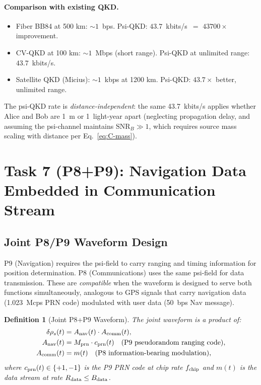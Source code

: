 \documentclass[aps,prd,twocolumn,superscriptaddress,nofootinbib]{revtex4-2}
\newcommand{\SNR}{\mathrm{SNR}}
\newtheorem{definition}{Definition}
\begin{document}
\paragraph{Comparison with existing QKD.}
\begin{itemize}
\item Fiber BB84 at 500 km: $\sim 1$~bps. Psi-QKD: $43.7$~kbits/s~$=$ $43700\times$ improvement.
\item CV-QKD at 100 km: $\sim 1$~Mbps (short range). Psi-QKD at unlimited range: $43.7$~kbits/s.
\item Satellite QKD (Micius): $\sim 1$~kbps at 1200 km. Psi-QKD: $43.7\times$ better, unlimited range.
\end{itemize}

The psi-QKD rate is \emph{distance-independent}: the same 43.7~kbits/s
applies whether Alice and Bob are 1~m or 1~light-year apart
(neglecting propagation delay, and assuming the psi-channel maintains
$\SNR_B \gg 1$, which requires source mass scaling with distance per
Eq.~\eqref{eq:C-mass}).

\section{Task 7 (P8+P9): Navigation Data Embedded in Communication Stream}
\label{sec:nav-embed}

\subsection{Joint P8/P9 Waveform Design}

P9 (Navigation) requires the psi-field to carry ranging and timing information
for position determination. P8 (Communications) uses the same psi-field
for data transmission. These are \emph{compatible} when the waveform is designed
to serve both functions simultaneously, analogous to GPS signals that carry
navigation data (1.023~Mcps PRN code) modulated with user data (50~bps Nav message).

\begin{definition}[Joint P8+P9 Waveform]
The joint waveform is a product of:
\begin{align}
\delta\rho_s(t) &= A_{\rm nav}(t) \cdot A_{\rm comm}(t), \\
A_{\rm nav}(t) &= M_{\rm prn} \cdot c_{\rm prn}(t) \quad \text{(P9 pseudorandom ranging code)}, \\
A_{\rm comm}(t) &= m(t) \quad \text{(P8 information-bearing modulation)},
\end{align}
where $c_{\rm prn}(t) \in \{+1,-1\}$ is the P9 PRN code at chip rate $f_{\rm chip}$
and $m(t)$ is the data stream at rate $R_{\rm data} \leq B_{\rm data}$.
\end{definition}
\end{document}
